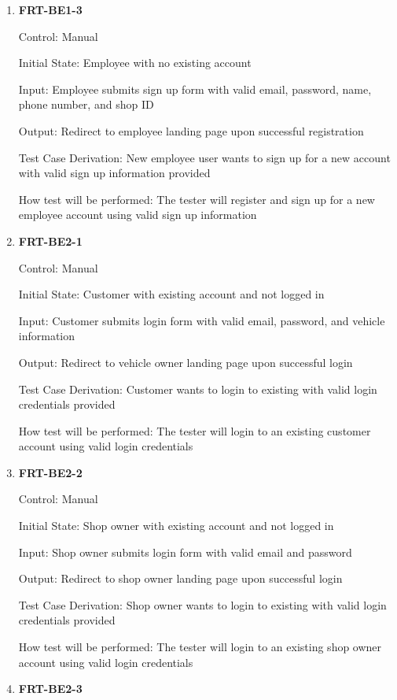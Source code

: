 \documentclass[12pt, titlepage]{article}
\begin{document}
\begin{enumerate}
	\item \textbf{FRT-BE1-3}

	      Control: Manual

	      Initial State: Employee with no existing account

	      Input: Employee submits sign up form with valid email, password, name, phone number, and shop ID

	      Output: Redirect to employee landing page upon successful registration

	      Test Case Derivation: New employee user wants to sign up for a new account with valid sign up
	      information provided

	      How test will be performed: The tester will register and sign up for a new employee account using
	      valid sign up information

	\item \textbf{FRT-BE2-1}

	      Control: Manual

	      Initial State: Customer with existing account and not logged in

	      Input: Customer submits login form with valid email, password, and vehicle information

	      Output: Redirect to vehicle owner landing page upon successful login

	      Test Case Derivation: Customer wants to login to existing with valid login credentials provided

	      How test will be performed: The tester will login to an existing customer account using valid login
	      credentials

	\item \textbf{FRT-BE2-2}

	      Control: Manual

	      Initial State: Shop owner with existing account and not logged in

	      Input: Shop owner submits login form with valid email and password

	      Output: Redirect to shop owner landing page upon successful login

	      Test Case Derivation: Shop owner wants to login to existing with valid login credentials provided

	      How test will be performed: The tester will login to an existing shop owner account using valid
	      login credentials

	\item \textbf{FRT-BE2-3}


\end{enumerate}
\end{document}
